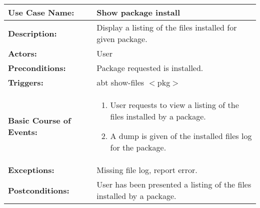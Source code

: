 
\begin{tabularx}{\linewidth}{|l|X|}
\hline
\textbf{Use Case Name:} & \textbf{Show package install} \\
\hline
\textbf{Description:} & Display a listing of the files installed for given package. \\
\hline
\textbf{Actors:} & User \\
\hline
\textbf{Preconditions:} & Package requested is installed. \\
\hline
\textbf{Triggers:} & abt show-files $<$pkg$>$ \\
\hline
\textbf{Basic Course of Events:} & 
\begin{minipage}{\linewidth} 
  \vspace{0.05em}
  \begin{enumerate}
    \item User requests to view a listing of the files installed by a package.
    \item A dump is given of the installed files log for the package.
  \end{enumerate}
  \vspace{0.05em}
\end{minipage}
\\
\hline 
\textbf{Exceptions:} & Missing file log, report error. \\
\hline 
\textbf{Postconditions:} &
User has been presented a listing of the files installed by a package. \\
\hline
\end{tabularx}


